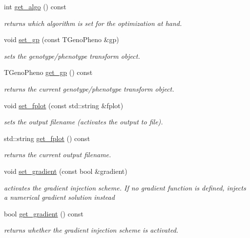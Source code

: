 \begin{DoxyCompactItemize}
int \hyperlink{classlibcmaes_1_1Parameters_a39697cd6cfb705a970223f8e95894545}{get\-\_\-algo} () const 
\begin{DoxyCompactList}\small\item\em returns which algorithm is set for the optimization at hand. \end{DoxyCompactList}\item 
void \hyperlink{classlibcmaes_1_1Parameters_aeeab862124b864147e143bd86eb51cb5}{set\-\_\-gp} (const T\-Geno\-Pheno \&gp)
\begin{DoxyCompactList}\small\item\em sets the genotype/phenotype transform object. \end{DoxyCompactList}\item 
T\-Geno\-Pheno \hyperlink{classlibcmaes_1_1Parameters_a365039e6948ee2242c0ad34ed4ff02ab}{get\-\_\-gp} () const 
\begin{DoxyCompactList}\small\item\em returns the current genotype/phenotype transform object. \end{DoxyCompactList}\item 
void \hyperlink{classlibcmaes_1_1Parameters_ab96a2149ca63863d3f5618f54097df44}{set\-\_\-fplot} (const std\-::string \&fplot)
\begin{DoxyCompactList}\small\item\em sets the output filename (activates the output to file). \end{DoxyCompactList}\item 
std\-::string \hyperlink{classlibcmaes_1_1Parameters_a6787bd16e95db6125a5e131ad58574cc}{get\-\_\-fplot} () const 
\begin{DoxyCompactList}\small\item\em returns the current output filename. \end{DoxyCompactList}\item 
void \hyperlink{classlibcmaes_1_1Parameters_a38082ad1568c356caff5b299d6faea11}{set\-\_\-gradient} (const bool \&gradient)
\begin{DoxyCompactList}\small\item\em activates the gradient injection scheme. If no gradient function is defined, injects a numerical gradient solution instead \end{DoxyCompactList}\item 
bool \hyperlink{classlibcmaes_1_1Parameters_ac7f6c27e00d1c0d744221b5a32e9efee}{get\-\_\-gradient} () const 
\begin{DoxyCompactList}\small\item\em returns whether the gradient injection scheme is activated. \end{DoxyCompactList}\item 

\end{DoxyCompactItemize}
